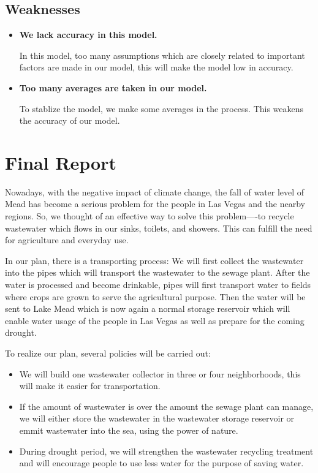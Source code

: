 \documentclass[12pt]{article}
\theoremstyle{definition}
\theoremstyle{remark}
\numberwithin{equation}{section}
\begin{document}
	\subsection{Weaknesses}
		\begin{itemize}
			\item \textbf{We lack accuracy in this model.}
			
			In this model, too many assumptions which are closely related to important factors are made in our model, this will make the model low in accuracy.
			
			\item \textbf{Too many averages are taken in our model.}
			
			To stablize the model, we make some averages in the process. This weakens the accuracy of our model.
		\end{itemize}

\newpage
\section{Final Report}
	Nowadays, with the negative impact of climate change, the fall of water level of Mead has become a serious problem for the people in Las Vegas and the nearby regions. So, we thought of an effective way to solve this problem----to recycle wastewater which flows in our sinks, toilets, and showers. This can fulfill the need for agriculture and everyday use.

	In our plan, there is a transporting process:
	We will first collect the wastewater into the pipes which will transport the wastewater to the sewage plant.
	After the water is processed and become drinkable, pipes will first transport water to fields where crops are grown to serve the agricultural purpose. 
	Then the water will be sent to Lake Mead which is now again a normal storage reservoir which will enable water usage of the people in Las Vegas as well as prepare for the coming drought.

	To realize our plan, several policies will be carried out:
	\begin{itemize}
		\item We will build one wastewater collector in three or four neighborhoods, this will make it easier for transportation.
		\item  If the amount of wastewater is over the amount the sewage plant can manage, we will either store the wastewater in the wastewater storage reservoir or emmit wastewater into the sea, using the power of nature.
		\item During drought period, we will strengthen the wastewater recycling treatment and will encourage people to use less water for the purpose of saving water.
	\end{itemize}
\end{document}
